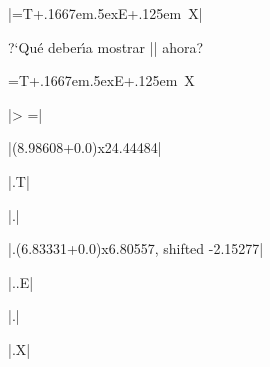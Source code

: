 


\bigskip


|=\hbox{{T\kern+.1667em\raise.5ex\hbox{E}\kern+.125em X}}|

\noindent ?`Qu\'e deber\'{\i}a mostrar || ahora?

\bigskip

\respuestaS 

\batchmode %
{}=\hbox{{T\kern+.1667em\raise.5ex\hbox{E}\kern+.125em X}}

|> =|

|\hbox(8.98608+0.0)x24.44484|

|.\tenrm T|

|.|

|.\hbox(6.83331+0.0)x6.80557, shifted -2.15277|

|..\tenrm E|

|.|

|.\tenrm X|

\bye


